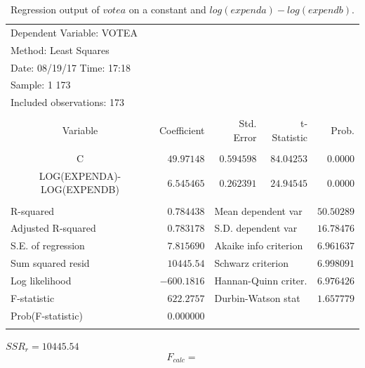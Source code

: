 \documentclass[12pt]{report}
\begin{document}
\begin{table}[H]
	\centering
	\begin{tabular}{lrrrr}
		\multicolumn{3}{l}{Dependent Variable: VOTEA}&\multicolumn{1}{c}{}&\multicolumn{1}{c}{}\\
		\multicolumn{3}{l}{Method: Least Squares}&\multicolumn{1}{c}{}&\multicolumn{1}{c}{}\\
		\multicolumn{3}{l}{Date: 08/19/17   Time: 17:18}&\multicolumn{1}{c}{}&\multicolumn{1}{c}{}\\
		\multicolumn{2}{l}{Sample: 1 173}&\multicolumn{1}{c}{}&\multicolumn{1}{c}{}&\multicolumn{1}{c}{}\\
		\multicolumn{3}{l}{Included observations: 173}&\multicolumn{1}{c}{}&\multicolumn{1}{c}{}\\
		[4.5pt] \hline \\ [-4.5pt]
		\multicolumn{1}{c}{Variable}&\multicolumn{1}{r}{Coefficient}&\multicolumn{1}{r}{Std. Error}&\multicolumn{1}{r}{t-Statistic}&\multicolumn{1}{r}{Prob.}\\
		[4.5pt] \hline \\ [-4.5pt]
		\multicolumn{1}{c}{C}&\multicolumn{1}{r}{$49.97148$}&\multicolumn{1}{r}{$0.594598$}&\multicolumn{1}{r}{$84.04253$}&\multicolumn{1}{r}{$0.0000$}\\
		\multicolumn{1}{c}{LOG(EXPENDA)-LOG(EXPENDB)}&\multicolumn{1}{r}{$6.545465$}&\multicolumn{1}{r}{$0.262391$}&\multicolumn{1}{r}{$24.94545$}&\multicolumn{1}{r}{$0.0000$}\\
		[4.5pt] \hline \\ [-4.5pt]
		\multicolumn{1}{l}{R-squared}&\multicolumn{1}{r}{$0.784438$}&\multicolumn{2}{l}{Mean dependent var}&\multicolumn{1}{r}{$50.50289$}\\
		\multicolumn{1}{l}{Adjusted R-squared}&\multicolumn{1}{r}{$0.783178$}&\multicolumn{2}{l}{S.D. dependent var}&\multicolumn{1}{r}{$16.78476$}\\
		\multicolumn{1}{l}{S.E. of regression}&\multicolumn{1}{r}{$7.815690$}&\multicolumn{2}{l}{Akaike info criterion}&\multicolumn{1}{r}{$6.961637$}\\
		\multicolumn{1}{l}{Sum squared resid}&\multicolumn{1}{r}{$10445.54$}&\multicolumn{2}{l}{Schwarz criterion}&\multicolumn{1}{r}{$6.998091$}\\
		\multicolumn{1}{l}{Log likelihood}&\multicolumn{1}{r}{$-600.1816$}&\multicolumn{2}{l}{Hannan-Quinn criter.}&\multicolumn{1}{r}{$6.976426$}\\
		\multicolumn{1}{l}{F-statistic}&\multicolumn{1}{r}{$622.2757$}&\multicolumn{2}{l}{Durbin-Watson stat}&\multicolumn{1}{r}{$1.657779$}\\
		\multicolumn{1}{l}{Prob(F-statistic)}&\multicolumn{1}{r}{$0.000000$}&\multicolumn{1}{c}{}&\multicolumn{1}{c}{}&\multicolumn{1}{c}{}\\
		[4.5pt] \hline \\ [-4.5pt]
	\end{tabular}
	\caption{Regression output of $votea$ on a constant and $log(expenda)-log(expendb)$.}
\end{table}
\vspace{-\baselineskip}
\centering $SSR_r = 10445.54$
$$F_{calc} = $$
\end{document}
